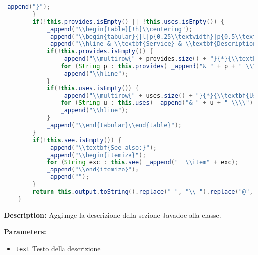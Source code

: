 \begin{lstlisting}[language=Java]
            _append("}");
        }
        if(!this.provides.isEmpty() || !this.uses.isEmpty()) {
            _append("\\begin{table}[!h]\\centering");
            _append("\\begin{tabular}{|l|p{0.25\\textwidth}|p{0.5\\textwidth}|}");
            _append("\\hline & \\textbf{Service} & \\textbf{Description} \\\\ \\hline");
            if(!this.provides.isEmpty()) {
                _append("\\multirow{" + provides.size() + "}{*}{\\textbf{Provides}}");
                for (String p : this.provides) _append("& " + p + " \\\\");
                _append("\\hline");
            }
            if(!this.uses.isEmpty()) {
                _append("\\multirow{" + uses.size() + "}{*}{\\textbf{Uses}}");
                for (String u : this.uses) _append("& " + u + " \\\\");
                _append("\\hline");
            }
            _append("\\end{tabular}\\end{table}");
        }
        if(!this.see.isEmpty()) {
            _append("\\textbf{See also:}");
            _append("\\begin{itemize}");
            for (String exc : this.see) _append("  \\item" + exc);
            _append("\\end{itemize}");
            _append("");
        }
        return this.output.toString().replace("_", "\\_").replace("@", "\\atsign ");
    }
\end{lstlisting}
\textbf{Description:}  Aggiunge la descrizione della sezione Javadoc alla classe. 

\textbf{Parameters:}
\begin{itemize}
  \item\texttt{text} Testo della descrizione
\end{itemize}

